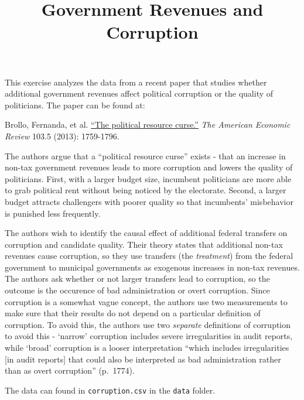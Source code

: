 \documentclass[]{article}
\title{Government Revenues and Corruption}
\author{}
\date{}
\begin{document}
\maketitle


This exercise analyzes the data from a recent paper that studies whether
additional government revenues affect political corruption or the
quality of politicians. The paper can be found at:

Brollo, Fernanda, et al.
\href{https://doi.org/10.1257/aer.103.5.1759}{``The political resource
curse.''} \emph{The American Economic Review} 103.5 (2013): 1759-1796.

The authors argue that a ``political resource curse'' exists - that an
increase in non-tax government revenues leads to more corruption and
lowers the quality of politicians. First, with a larger budget size,
incumbent politicians are more able to grab political rent without being
noticed by the electorate. Second, a larger budget attracts challengers
with poorer quality so that incumbents' misbehavior is punished less
frequently.

The authors wish to identify the causal effect of additional federal
transfers on corruption and candidate quality. Their theory states that
additional non-tax revenues cause corruption, so they use transfers (the
\emph{treatment}) from the federal government to municipal governments
as exogenous increases in non-tax revenues. The authors ask whether or
not larger transfers lead to corruption, so the outcome is the occurence
of bad administration or overt corruption. Since corruption is a
somewhat vague concept, the authors use two measurements to make sure
that their results do not depend on a particular definition of
corruption. To avoid this, the authors use two \emph{separate}
definitions of corruption to avoid this - `narrow' corruption includes
severe irregularities in audit reports, while `broad' corruption is a
looser interpretation ``which includes irregularities {[}in audit
reports{]} that could also be interpreted as bad administration rather
than as overt corruption'' (p.~1774).

The data can found in \texttt{corruption.csv} in the \texttt{data}
folder.
\end{document}
